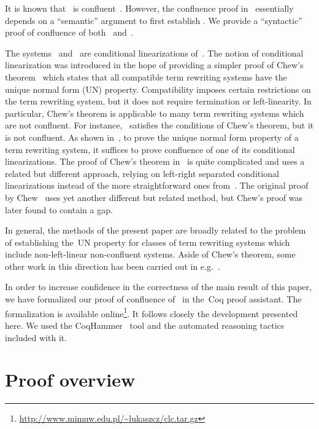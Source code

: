 \documentclass[a4paper,UKenglish]{lipics-v2016}
\begin{document}
It is known that~ is confluent~\cite{Vrijer1999}. However, the
confluence proof in~\cite{Vrijer1999} essentially depends on a
``semantic'' argument to first establish . We
provide a ``syntactic'' proof of confluence of both~
and~.

The systems~ and~ are conditional linearizations
of~. The notion of conditional linearization was introduced in
the hope of providing a simpler proof of Chew's
theorem~\cite{Chew1981,ManoOgawa2001} which states that all compatible
term rewriting systems have the unique normal form (UN)
property. Compatibility imposes certain restrictions on the term
rewriting system, but it does not require termination or
left-linearity. In particular, Chew's theorem is applicable to many
term rewriting systems which are not confluent. For instance,~
satisfies the conditions of Chew's theorem, but it is not
confluent. As shown in~\cite{Vrijer1999}, to prove the unique normal
form property of a term rewriting system, it suffices to prove
confluence of one of its conditional linearizations. The proof of
Chew's theorem in~\cite{ManoOgawa2001} is quite complicated and uses a
related but different approach, relying on left-right separated
conditional linearizations instead of the more straightforward ones
from~\cite{Vrijer1999}. The original proof by Chew~\cite{Chew1981}
uses yet another different but related method, but Chew's proof was
later found to contain a gap.

In general, the methods of the present paper are broadly related to
the problem of establishing the~UN property for classes of term
rewriting systems which include non-left-linear non-confluent
systems. Aside of Chew's theorem, some other work in this direction
has been carried out in
e.g.~\cite{KlopVrijer1989,ToyamaOyamaguchi1995,Verma1997,Stovring2006,KahrsSmith2016}.

In order to increase confidence in the correctness of the main result
of this paper, we have formalized our proof of confluence of~ in
the~Coq proof assistant. The formalization is available
online\footnote{\url{http://www.mimuw.edu.pl/~lukaszcz/clc.tar.gz}}. It
follows closely the development presented here. We used the
CoqHammer~\cite{CzajkaKaliszyk2017Submitted} tool and the automated
reasoning tactics included with it.

\section{Proof overview}\label{sec_overview}
\end{document}
